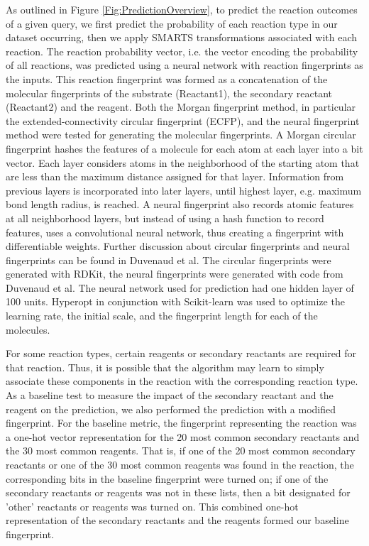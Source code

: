As outlined in Figure \ref{Fig:PredictionOverview}, to predict the reaction outcomes of a given query, we first predict the probability of each reaction type in our dataset occurring, then we apply SMARTS transformations associated with each reaction. The reaction probability vector, i.e. the vector encoding the probability of all reactions, was predicted using a neural network with reaction fingerprints as the inputs. This reaction fingerprint was formed as a concatenation of the molecular fingerprints of the substrate (Reactant1), the secondary reactant (Reactant2) and the reagent. Both the Morgan fingerprint method, in particular the extended-connectivity circular fingerprint (ECFP), and the neural fingerprint method were tested for generating the molecular fingerprints. A Morgan circular fingerprint hashes the features of a molecule for each atom at each layer into a bit vector. Each layer considers atoms in the neighborhood of the starting atom that are less than the maximum distance assigned for that layer. Information from previous layers is incorporated into later layers, until highest layer, e.g. maximum bond length radius, is reached\cite{Rogers2010Extended}. A neural fingerprint also records atomic features at all neighborhood layers, but instead of using a hash function to record features, uses a convolutional neural network, thus creating a fingerprint with differentiable weights. Further discussion about circular fingerprints and neural fingerprints can be found in Duvenaud et al\cite{duvenaud_convolutional_2015}. The circular fingerprints were generated with RDKit, the neural fingerprints were generated with code from Duvenaud et al\cite{duvenaud_convolutional_2015}. The neural network used for prediction had one hidden layer of 100 units. Hyperopt \cite{Bergstra_2015} in conjunction with Scikit-learn \cite{scikit-learn} was used to optimize the learning rate, the initial scale, and the fingerprint length for each of the molecules. 

For some reaction types, certain reagents or secondary reactants are required for that reaction. Thus, it is possible that the algorithm may learn to simply associate these components in the reaction with the corresponding reaction type. As a baseline test to measure the impact of the secondary reactant and the reagent on the prediction, we also performed the prediction with a modified fingerprint. For the baseline metric, the fingerprint representing the reaction was a one-hot vector representation for the 20 most common secondary reactants and the 30 most common reagents. That is, if one of the 20 most common secondary reactants or one of the 30 most common reagents was found in the reaction, the corresponding bits in the baseline fingerprint were turned on; if one of the secondary reactants or reagents was not in these lists, then a bit designated for 'other' reactants or reagents was turned on. This combined one-hot representation of the secondary reactants and the reagents formed our baseline fingerprint. 

